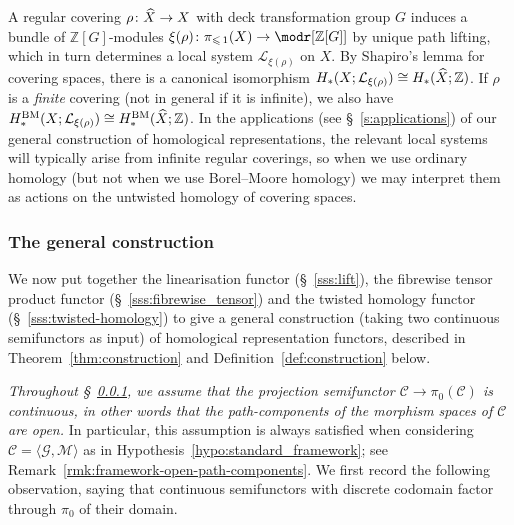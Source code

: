 \documentclass[AHL,Unicode,published]{cedram}
\newcommand{\BM}{\mathrm{BM}}
\newcommand{\cC}{\mathcal{C}}
\newcommand{\cG}{\mathcal{G}}
\newcommand{\cL}{\mathcal{L}}
\newcommand{\cM}{\mathcal{M}}
\newcommand{\bZ}{\mathbb{Z}}
\renewcommand{\leq}{\leqslant}
\let\oldhat\hat
\renewcommand*{\hat}[1]{\mathchoice{\widehat{#1}}{\widehat{#1}}{\oldhat{#1}}{\oldhat{#1}}}
\begin{document}
\begin{rema}\label{rmk:covering-spaces}
A regular covering $\rho \colon \hat{X} \to X$ with deck transformation group $G$ induces a bundle of $\bZ[G]$-modules $\xi(\rho) \colon \pi_{\leq\,1}(X) \to \modr[{\bZ[G]}]$ by unique path lifting, which in turn determines a local system $\cL_{\xi(\rho)}$ on $X$. By Shapiro's lemma for covering spaces, there is a canonical isomorphism $H_*(X;\cL_{\xi(\rho)}) \cong H_*(\hat{X};\bZ)$. If $\rho$ is a \emph{finite} covering (not in general if it is infinite), we also have $H_*^{\BM}(X;\cL_{\xi(\rho)}) \cong H_*^{\BM}(\hat{X};\bZ)$. In the applications (see \S~\ref{s:applications}) of our general construction of homological representations, the relevant local systems will typically arise from infinite regular coverings, so when we use ordinary homology (but not when we use Borel--Moore homology) we may interpret them as actions on the untwisted homology of covering spaces.
\end{rema}


\subsubsection{The general construction}\label{sss:construction}

We now put together the linearisation functor (\S~\ref{sss:lift}), the fibrewise tensor product functor (\S~\ref{sss:fibrewise_tensor}) and the twisted homology functor (\S~\ref{sss:twisted-homology}) to give a general construction (taking two continuous semifunctors as input) of homological representation functors, described in Theorem~\ref{thm:construction} and Definition~\ref{def:construction} below.

\emph{Throughout \S~\ref{sss:construction}, we assume that the projection semifunctor $\cC \to \pi_{0}(\cC)$ is \emph{continuous}, in other words that the path-components of the morphism spaces of $\cC$ are open.} In particular, this assumption is always satisfied when considering $\cC=\langle \cG, \cM\rangle$ as in Hypothesis~\ref{hypo:standard_framework}; see Remark~\ref{rmk:framework-open-path-components}. We first record the following observation, saying that continuous semifunctors with discrete codomain factor through $\pi_{0}$ of their domain.
\end{document}
